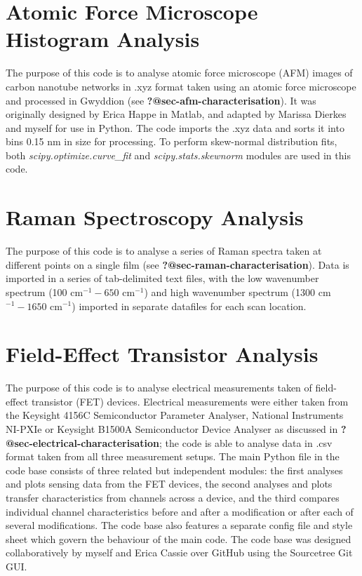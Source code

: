 \documentclass[
  a4paper,
]{scrbook}
\begin{document}
\hypertarget{sec-histogram-analysis}{%
\section{Atomic Force Microscope Histogram
Analysis}\label{sec-histogram-analysis}}

The purpose of this code is to analyse atomic force microscope (AFM)
images of carbon nanotube networks in .xyz format taken using an atomic
force microscope and processed in Gwyddion (see
\textbf{?@sec-afm-characterisation}). It was originally designed by
Erica Happe in Matlab, and adapted by Marissa Dierkes and myself for use
in Python. The code imports the .xyz data and sorts it into bins 0.15 nm
in size for processing. To perform skew-normal distribution fits, both
\emph{scipy.optimize.curve\_fit} and \emph{scipy.stats.skewnorm} modules
are used in this code.

\hypertarget{sec-raman-analysis}{%
\section{Raman Spectroscopy Analysis}\label{sec-raman-analysis}}

The purpose of this code is to analyse a series of Raman spectra taken
at different points on a single film (see
\textbf{?@sec-raman-characterisation}). Data is imported in a series of
tab-delimited text files, with the low wavenumber spectrum (100
cm\(^{-1} - 650\) cm\(^{-1}\)) and high wavenumber spectrum (1300
cm\(^{-1} - 1650\) cm\(^{-1}\)) imported in separate datafiles for each
scan location.

\hypertarget{sec-field-effect-transistor-analysis}{%
\section{Field-Effect Transistor
Analysis}\label{sec-field-effect-transistor-analysis}}

The purpose of this code is to analyse electrical measurements taken of
field-effect transistor (FET) devices. Electrical measurements were
either taken from the Keysight 4156C Semiconductor Parameter Analyser,
National Instruments NI-PXIe or Keysight B1500A Semiconductor Device
Analyser as discussed in \textbf{?@sec-electrical-characterisation}; the
code is able to analyse data in .csv format taken from all three
measurement setups. The main Python file in the code base consists of
three related but independent modules: the first analyses and plots
sensing data from the FET devices, the second analyses and plots
transfer characteristics from channels across a device, and the third
compares individual channel characteristics before and after a
modification or after each of several modifications. The code base also
features a separate config file and style sheet which govern the
behaviour of the main code. The code base was designed collaboratively
by myself and Erica Cassie over GitHub using the Sourcetree Git GUI.


\backmatter
\printbibliography
\end{document}
